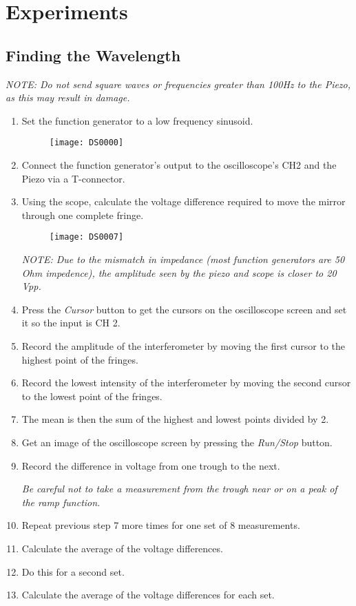 
\section{Experiments}
	\subsection{Finding the Wavelength}

\emph{NOTE: Do not send square waves or frequencies greater than 100Hz
to the Piezo, as this may result in damage.}

\begin{enumerate}
 	\item Set the function generator to a low frequency sinusoid.
		\begin{figure}[ht!]
		\centering
		\texttt{[image: DS0000]}
		\end{figure}
	\item Connect the function generator's output to the oscilloscope's CH2
        and the Piezo via a T-connector.
	\item Using the scope, calculate the voltage difference required
		  to move the mirror through one complete fringe.
		\begin{figure}[ht!]
		\centering
		\texttt{[image: DS0007]}
		\end{figure}

	\emph{NOTE: Due to the mismatch in impedance (most function generators
		are 50 Ohm impedence), the amplitude seen by the piezo and scope is closer to 20 Vpp.}
	
	\item Press the \emph{Cursor} button to get the cursors on the oscilloscope screen and set it so the input is CH 2.
	\item Record the amplitude of the interferometer by moving the first cursor to the highest point of the fringes.
	\item Record the lowest intensity of the interferometer by moving the second cursor to the lowest point of the fringes.
	\item The mean is then the sum of the highest and lowest points divided by 2.
	\item Get an image of the oscilloscope screen by pressing the \emph{Run/Stop} button. 
	\item Record the difference in voltage from one trough to the next. 
	
	\emph{Be careful not to take a measurement from the trough near or on a peak of the ramp function.}
	
	\item Repeat previous step 7 more times for one set of 8 measurements. 
	\item Calculate the average of the voltage differences.
	\item Do this for a second set.
	\item Calculate the average of the voltage differences for each set.
\end{enumerate}



